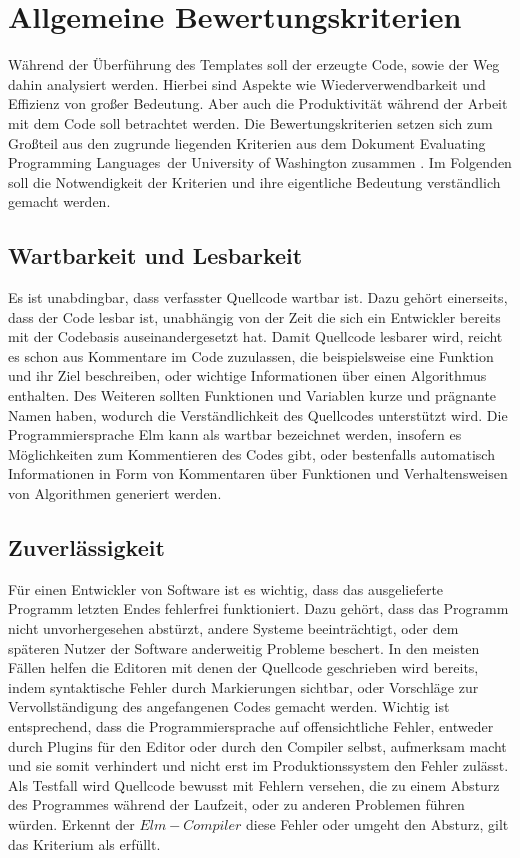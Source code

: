 \section{Allgemeine Bewertungskriterien}
\label{sec:Bewertungskriterien}
Während der Überführung des Templates soll der erzeugte Code, sowie der Weg dahin analysiert werden. Hierbei sind Aspekte wie Wiederverwendbarkeit und Effizienz von großer Bedeutung. Aber auch die Produktivität während der Arbeit mit dem Code soll betrachtet werden. Die Bewertungskriterien setzen sich zum Großteil aus den zugrunde liegenden Kriterien aus dem Dokument \glqq Evaluating Programming Languages\grqq~der University of Washington zusammen \cite[Vgl. ff.]{washington-evaluation}. Im Folgenden soll die Notwendigkeit der Kriterien und ihre eigentliche Bedeutung verständlich gemacht werden.


\subsection{Wartbarkeit und Lesbarkeit}
\label{sec:muster_wartbarkeit_und_lesbarkeit}
Es ist unabdingbar, dass verfasster Quellcode wartbar ist. Dazu gehört einerseits, dass der Code lesbar ist, unabhängig von der Zeit die sich ein Entwickler bereits mit der Codebasis auseinandergesetzt hat. Damit Quellcode lesbarer wird, reicht es schon aus Kommentare im Code zuzulassen, die beispielsweise eine Funktion und ihr Ziel beschreiben, oder wichtige Informationen über einen Algorithmus enthalten. Des Weiteren sollten Funktionen und Variablen kurze und prägnante Namen haben, wodurch die Verständlichkeit des Quellcodes unterstützt wird. Die Programmiersprache Elm kann als wartbar bezeichnet werden, insofern es Möglichkeiten zum Kommentieren des Codes gibt, oder bestenfalls automatisch Informationen in Form von Kommentaren über Funktionen und Verhaltensweisen von Algorithmen generiert werden.


\subsection{Zuverlässigkeit}
\label{sec:muster_zuverlaessigkeit}
Für einen Entwickler von Software ist es wichtig, dass das ausgelieferte Programm letzten Endes fehlerfrei funktioniert. Dazu gehört, dass das Programm nicht unvorhergesehen abstürzt, andere Systeme beeinträchtigt, oder dem späteren Nutzer der Software anderweitig Probleme beschert. In den meisten Fällen helfen die Editoren mit denen der Quellcode geschrieben wird bereits, indem syntaktische Fehler durch Markierungen sichtbar, oder Vorschläge zur Vervollständigung des angefangenen Codes gemacht werden. Wichtig ist entsprechend, dass die Programmiersprache auf offensichtliche Fehler, entweder durch Plugins für den Editor oder durch den Compiler selbst, aufmerksam macht und sie somit verhindert und nicht erst im Produktionssystem den Fehler zulässt. Als Testfall wird Quellcode bewusst mit Fehlern versehen, die zu einem Absturz des Programmes während der Laufzeit, oder zu anderen Problemen führen würden. Erkennt der $Elm-Compiler$ diese Fehler oder umgeht den Absturz, gilt das Kriterium als erfüllt.


